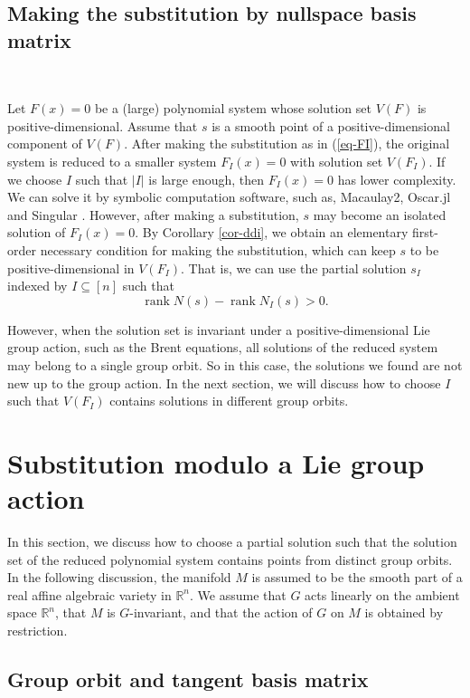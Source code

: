 \documentclass[10pt,a4paper]{amsart}
\numberwithin{equation}{section}
\newcounter{condition}
\begin{document}
\subsection{Making the substitution by nullspace basis matrix} 
\label{subsec-first}
\

Let $F(x)=0$ be a (large) polynomial system whose solution set $V(F)$ is positive-dimensional. Assume that $s$ is a smooth point of a positive-dimensional component of $V(F)$. After making the substitution as in (\ref{eq-FI}), the original system is reduced to a smaller system $F_I(x)=0$ with solution set $V(F_I)$. If we choose $I$ such that $|I|$ is large enough, then $F_I(x)=0$ has lower complexity. We can solve it by symbolic computation software, such as, Macaulay2, Oscar.jl and Singular \cite{Dec25,Eis-M2book02,GreuelPf08}. However, after making a substitution, $s$ may become an isolated solution of $F_I(x)=0$. By Corollary \ref{cor-ddi}, we obtain an elementary first-order necessary condition for making the substitution, which can keep $s$ to be positive-dimensional in $V(F_I)$. That is, we can use the partial solution $s_I$ indexed by $I\subseteq [n]$ such that $$\operatorname{rank}N(s)-\operatorname{rank}N_I(s)>0.$$

However, when the solution set is invariant under a positive-dimensional Lie group action, such as the Brent equations\cite{Heule21,li25def}, all solutions of the reduced system may belong to a single group orbit. So in this case, the solutions we found are not new up to the group action. In the next section, we will discuss how to choose $I$ such that $V(F_I)$ contains solutions in different group orbits.

\section{Substitution modulo a Lie group action}
\label{sec-subslg}
In this section, we discuss how to choose a partial solution such
that the solution set of the reduced polynomial system contains
points from distinct group orbits. In the following discussion, the
manifold $M$ is assumed to be the smooth part of a real affine algebraic
variety in $\mathbb{R}^n$. We assume that $G$ acts linearly on the ambient space $\mathbb{R}^n$, that $M$ is $G$-invariant, and that the action of
$G$ on $M$ is obtained by restriction.
\subsection{Group orbit and tangent basis matrix} 
\
\end{document}
